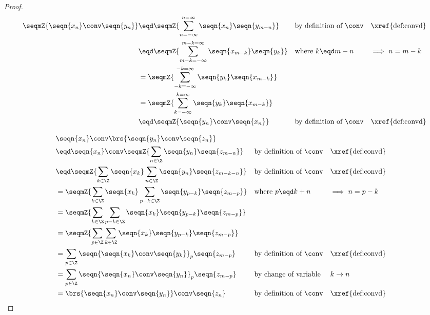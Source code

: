 \begin{proof}
\begin{align*}
  \seqmZ{\seqn{x_n}\conv\seqn{y_n}}
    &\eqd \seqmZ{\sum_{n=-\infty}^{n=\infty} \seqn{x_n}\seqn{y_{m-n}}}
    && \text{by definition of $\conv$}
    && \text{\xref{def:convd}}
  \\&\eqd \seqmZ{\sum_{m-k=-\infty}^{m-k=\infty} \seqn{x_{m-k}}\seqn{y_k}}
    && \text{where $k\eqd m-n$}
    && \text{$\implies$ $n=m-k$}
  \\&= \seqmZ{\sum_{-k=-\infty}^{-k=\infty}\seqn{y_k} \seqn{x_{m-k}}}
  \\&= \seqmZ{\sum_{k=-\infty}^{k=\infty}\seqn{y_k} \seqn{x_{m-k}}}
  \\&\eqd \seqmZ{\seqn{y_n}\conv\seqn{x_n}}
    && \text{by definition of $\conv$}
    && \text{\xref{def:convd}}
\end{align*}

\begin{align*}
  &\seqn{x_n}\conv\brs{\seqn{y_n}\conv\seqn{z_n}}
  \\&\eqd \seqn{x_n}\conv\seqmZ{\sum_{n\in\Z} \seqn{y_n}\seqn{z_{m-n}}}
    && \text{by definition of $\conv$}
    && \text{\xref{def:convd}}
  \\&\eqd \seqmZ{\sum_{k\in\Z} \seqn{x_k} \sum_{n\in\Z} \seqn{y_n} \seqn{z_{m-k-n}}}
    && \text{by definition of $\conv$}
    && \text{\xref{def:convd}}
  \\&= \seqmZ{\sum_{k\in\Z} \seqn{x_k} \sum_{p-k\in\Z} \seqn{y_{p-k}} \seqn{z_{m-p}}}
    && \text{where $p\eqd k+n$}
    && \text{$\implies$ $n=p-k$}
  \\&= \seqmZ{\sum_{k\in\Z} \sum_{p-k\in\Z} \seqn{x_k} \seqn{y_{p-k}} \seqn{z_{m-p}}}
  \\&= \seqmZ{\sum_{p\in\Z} \sum_{k\in\Z} \seqn{x_k} \seqn{y_{p-k}} \seqn{z_{m-p}}}
  \\&= {\sum_{p\in\Z} \seqn{\seqn{x_k}\conv\seqn{y_k}}_p \seqn{z_{m-p}}}
    && \text{by definition of $\conv$}
    && \text{\xref{def:convd}}
  \\&= {\sum_{p\in\Z} \seqn{\seqn{x_n}\conv\seqn{y_n}}_p \seqn{z_{m-p}}}
    && \text{by change of variable}
    && \text{$k\to n$}
  \\&= \brs{\seqn{x_n}\conv\seqn{y_n}} \conv\seqn{z_n}
    && \text{by definition of $\conv$}
    && \text{\xref{def:convd}}
\end{align*}


\end{proof}
